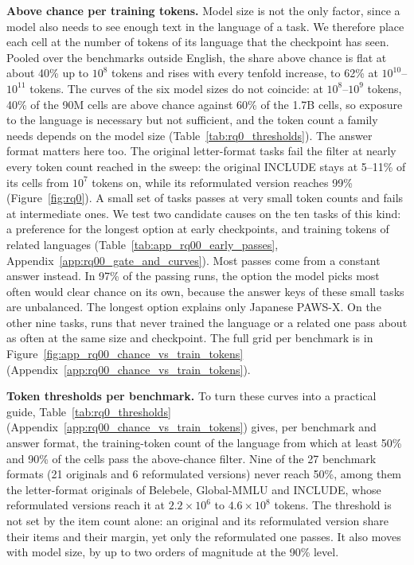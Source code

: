 \textbf{Above chance per training tokens.}
Model size is not the only factor, since a model also needs to see enough text in the language of a task. We therefore place each cell at the number of tokens of its language that the checkpoint has seen.
Pooled over the benchmarks outside English, the share above chance is flat at about 40\% up to $10^{8}$ tokens and rises with every tenfold increase, to 62\% at $10^{10}$--$10^{11}$ tokens.
The curves of the six model sizes do not coincide: at $10^{8}$--$10^{9}$ tokens, 40\% of the 90M cells are above chance against 60\% of the 1.7B cells, so exposure to the language is necessary but not sufficient, and the token count a family needs depends on the model size (Table~\ref{tab:rq0_thresholds}).
The answer format matters here too. The original letter-format tasks fail the filter at nearly every token count reached in the sweep: the original INCLUDE stays at 5--11\% of its cells from $10^{7}$ tokens on, while its reformulated version reaches 99\% (Figure~\ref{fig:rq0}).
A small set of tasks passes at very small token counts and fails at intermediate ones. We test two candidate causes on the ten tasks of this kind: a preference for the longest option at early checkpoints, and training tokens of related languages (Table~\ref{tab:app_rq00_early_passes}, Appendix~\ref{app:rq00_gate_and_curves}). Most passes come from a constant answer instead. In 97\% of the passing runs, the option the model picks most often would clear chance on its own, because the answer keys of these small tasks are unbalanced. The longest option explains only Japanese PAWS-X. On the other nine tasks, runs that never trained the language or a related one pass about as often at the same size and checkpoint.
The full grid per benchmark is in Figure~\ref{fig:app_rq00_chance_vs_train_tokens} (Appendix~\ref{app:rq00_chance_vs_train_tokens}).

\textbf{Token thresholds per benchmark.}
To turn these curves into a practical guide, 
Table~\ref{tab:rq0_thresholds} (Appendix~\ref{app:rq00_chance_vs_train_tokens}) gives, per benchmark and answer format, the training-token count of the language from which at least 50\% and 90\% of the cells pass the above-chance filter. Nine of the 27 benchmark formats (21 originals and 6 reformulated versions) never reach 50\%, among them the letter-format originals of Belebele, Global-MMLU and INCLUDE, whose reformulated versions reach it at $2.2\times10^{6}$ to $4.6\times10^{8}$ tokens. The threshold is not set by the item count alone: an original and its reformulated version share their items and their margin, yet only the reformulated one passes. It also moves with model size, by up to two orders of magnitude at the 90\% level.

